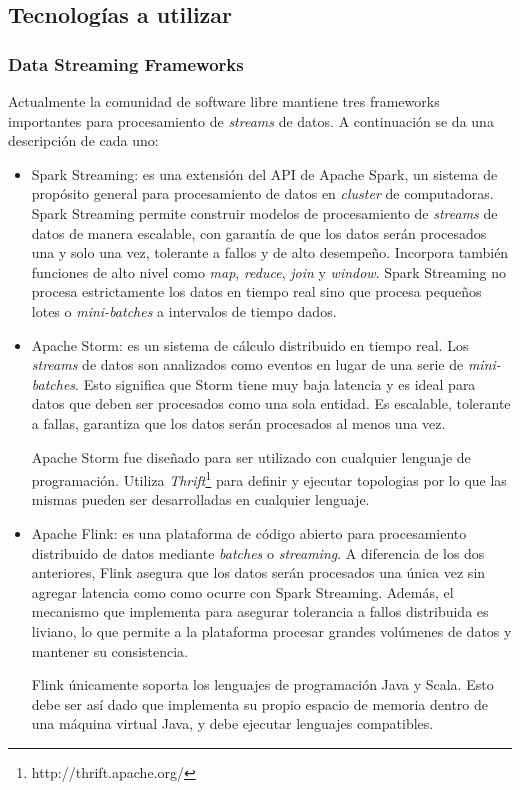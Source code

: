 \documentclass[a4paper,10pt, oneside]{article}
\begin{document}
\subsection*{Tecnologías a utilizar}
\subsubsection*{Data Streaming Frameworks}
Actualmente la comunidad de software libre mantiene tres frameworks importantes para procesamiento de \textit{streams} de datos. A continuación se da una descripción de cada uno:
\begin{itemize}
	\item Spark Streaming: es una extensión del API de Apache Spark, un sistema de propósito general para procesamiento de datos en \textit{cluster} de computadoras. Spark Streaming permite construir modelos de procesamiento de \textit{streams} de datos de manera escalable, con garantía de que los datos serán procesados una y solo una vez, tolerante a fallos y de alto desempeño. Incorpora también funciones de alto nivel como \textit{map}, \textit{reduce}, \textit{join} y \textit{window}. Spark Streaming no procesa estrictamente los datos en tiempo real sino que procesa pequeños lotes o \textit{mini-batches} a intervalos de tiempo dados.
	\item Apache Storm: es un sistema de cálculo distribuido en tiempo real. Los \textit{streams} de datos son analizados como eventos en lugar de una serie de \textit{mini-batches}. Esto significa que Storm tiene muy baja latencia y es ideal para datos que deben ser procesados como una sola entidad. Es escalable, tolerante a fallas, garantiza que los datos serán procesados al menos una vez.\par
	Apache Storm fue diseñado para ser utilizado con cualquier lenguaje de programación. Utiliza  \textit{Thrift}\footnote{http://thrift.apache.org/} para definir y ejecutar topologias por lo que las mismas pueden ser desarrolladas en cualquier lenguaje.
	\item Apache Flink: es una plataforma de código abierto para procesamiento distribuido de datos mediante \textit{batches} o \textit{streaming}. A diferencia de los dos anteriores, Flink asegura que los datos serán procesados una única vez sin agregar latencia como como ocurre con Spark Streaming. Además, el mecanismo que implementa para asegurar tolerancia a fallos distribuida es liviano\cite{chandy1985distributed}, lo que permite a la plataforma procesar grandes volúmenes de datos y mantener su consistencia.
	\par Flink únicamente soporta los lenguajes de programación Java y Scala. Esto debe ser así dado que implementa su propio espacio de memoria dentro de una máquina virtual Java, y debe ejecutar lenguajes compatibles.	
\end{itemize}
\end{document}
